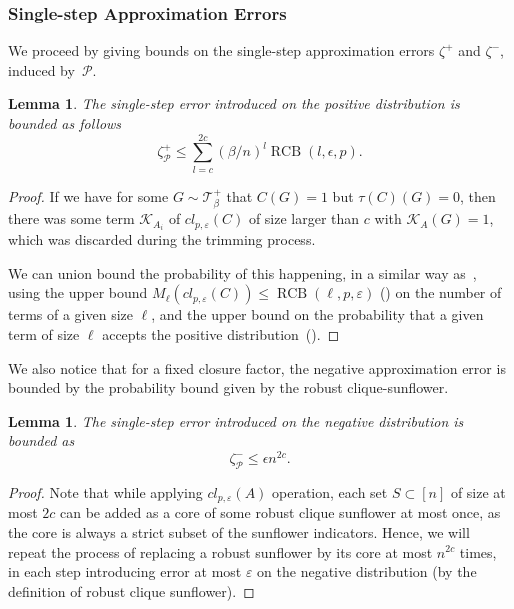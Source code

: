 \documentclass[10pt,a4paper]{article}
\newcommand{\cl}{cl}
\newcommand{\RCB}{\mathop{RCB}}
\newtheorem{lemma}[theorem]{Lemma}
\newcommand{\jnote}[1]{\todo[inline,backgroundcolor=blue!20!green]{#1 \\ \textsc{--Jarek}}}
\newcommand{\lnote}[1]{\todo[inline,backgroundcolor=blue!20!yellow]{#1 \\ \textsc{--Linus}}}
\begin{document}
\subsubsection*{Single-step Approximation Errors}

We proceed by giving bounds on the single-step approximation errors $\zeta^+$ and $\zeta^-$, induced by~$\mathcal{P}$.


\begin{lemma}
    \label{lem:positive-error}
    The single-step error introduced on the positive distribution is bounded as follows
    $$\zeta^+_{\mathcal{P}} \leq \sum_{l=c}^{2c} (\beta /n)^l \RCB(l, \epsilon, p).$$
\end{lemma}
 \begin{proof}
    If we have for some $G \sim \mathcal{T}^+_\beta$ that $C(G) = 1$ but $\tau(C)(G) = 0$, then there was some term $\mathcal{K}_{A_i}$ of $\cl_{p,\varepsilon}(C)$ of size larger than $c$ with $\mathcal{K}_A(G) = 1$, which was discarded during the trimming process. 

    We can union bound the probability of this happening, in a similar way as~, using the upper bound $M_\ell(\cl_{p, \varepsilon}(C)) \leq \RCB(\ell, p, \varepsilon)$ () on the number of terms of a given size $\ell$, and the upper bound on the probability that a given term of size $\ell$ accepts the positive distribution~().
\end{proof}

We also notice that for a fixed closure factor, the negative approximation error is bounded by the probability bound given by the robust clique-sunflower.

\begin{lemma}
    \label{lem:negative-error}
    The single-step error introduced on the negative distribution is bounded as 
    $$\zeta^-_{\mathcal{P}} \leq \epsilon n^{2c}.$$
\end{lemma}
\begin{proof}
    Note that while applying $\cl_{p,\varepsilon}(A)$ operation, each set $S \subset [n]$ of size at most $2c$ can be added as a core of some robust clique sunflower at most once, as the core is always a strict subset of the sunflower indicators. Hence, we will repeat the process of replacing a robust sunflower by its core at most $n^{2c}$ times, in each step introducing error at most $\varepsilon$ on the negative distribution (by the definition of robust clique sunflower).
\end{proof}
\end{document}
